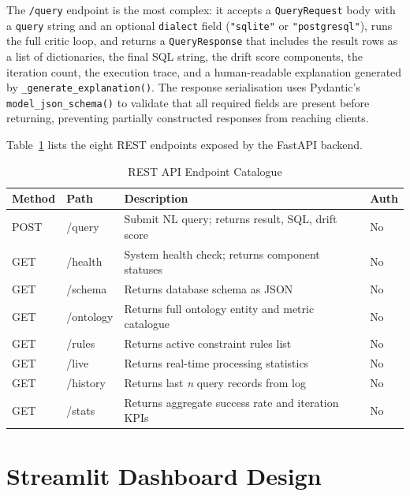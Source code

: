 \documentclass[12pt,a4paper]{report}
\begin{document}
The \texttt{/query} endpoint is the most complex: it accepts a \texttt{QueryRequest} body with a \texttt{query} string and an optional \texttt{dialect} field (\texttt{"sqlite"} or \texttt{"postgresql"}), runs the full critic loop, and returns a \texttt{QueryResponse} that includes the result rows as a list of dictionaries, the final \ac{SQL} string, the drift score components, the iteration count, the execution trace, and a human-readable explanation generated by \texttt{\_generate\_explanation()}. The response serialisation uses Pydantic's \texttt{model\_json\_schema()} to validate that all required fields are present before returning, preventing partially constructed responses from reaching clients.

Table~\ref{tab:api-endpoints} lists the eight \ac{REST} endpoints exposed by the FastAPI backend.

\begin{table}[H]
  \centering
  \caption{REST API Endpoint Catalogue}
  \label{tab:api-endpoints}
  \renewcommand{\arraystretch}{1.2}
  \begin{tabularx}{\textwidth}{@{}llXl@{}}
    \toprule
    \textbf{Method} & \textbf{Path} & \textbf{Description} & \textbf{Auth} \\
    \midrule
    POST & /query    & Submit NL query; returns result, SQL, drift score & No \\
    GET  & /health   & System health check; returns component statuses  & No \\
    GET  & /schema   & Returns database schema as JSON                  & No \\
    GET  & /ontology & Returns full ontology entity and metric catalogue & No \\
    GET  & /rules    & Returns active constraint rules list              & No \\
    GET  & /live     & Returns real-time processing statistics           & No \\
    GET  & /history  & Returns last \textit{n} query records from log   & No \\
    GET  & /stats    & Returns aggregate success rate and iteration KPIs & No \\
    \bottomrule
  \end{tabularx}
\end{table}

\section{Streamlit Dashboard Design}
\label{sec:dashboard-design}
\end{document}
